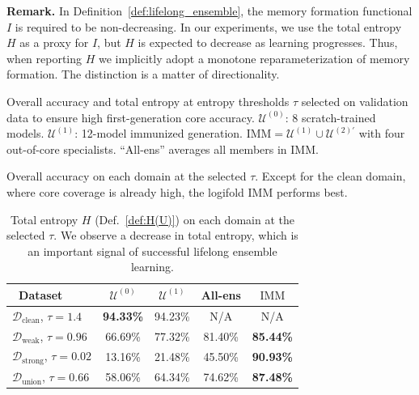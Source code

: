 \documentclass{article}
\theoremstyle{plain}
\theoremstyle{definition}
\theoremstyle{remark}
\newcommand{\cU}{\mathcal{U}}
\newcommand{\IMM}{\mathrm{IMM}}
\newcommand{\cD}{\mathcal{D}}
\begin{document}
\textbf{Remark.}
In Definition~\ref{def:lifelong_ensemble}, the memory formation functional $I$ is required to be non-decreasing.
In our experiments, we use the total entropy $H$ as a proxy for $I$, but $H$ is expected to decrease as learning progresses.
Thus, when reporting $H$ we implicitly adopt a monotone reparameterization of memory formation. The distinction is a matter of directionality.

\begin{table}[t]
	\centering
	\vspace{0.1in}
	\caption{Overall accuracy and total entropy at entropy thresholds $\tau$ selected on validation data to ensure high first-generation core accuracy. $\cU^{(0)}$: 8 scratch-trained models. $\cU^{(1)}$: 12-model immunized generation. $\IMM=\cU^{(1)}\cup\cU^{(2)'}$ with four out-of-core specialists. ``All-ens'' averages all members in $\IMM$.}
	
	\label{tab:eval_summary}
		\vspace{0.1in}

	
	\begin{subtable}{1.0\linewidth}
		\centering
			\vspace{0.1in}
			\caption{Overall accuracy on each domain at the selected $\tau$. Except for the clean domain, where core coverage is already high, the logifold $\IMM$ performs best.}
			
		\label{tab:acc_eval}
			\vspace{0.1in}
		{\footnotesize
		\begin{tabular}{lcccc}
			\toprule
			\  Dataset & $\cU^{(0)}$ & $\cU^{(1)}$  & All-ens& $\IMM$  \\
			\midrule
			$\cD_{\mathrm{clean}}$, \scriptsize{$\tau = 1.4$}  & \textbf{94.33\%} & 94.23\%& N/A& N/A \\
			$\cD_{\mathrm{weak}}$, \scriptsize{$\tau = 0.96$}& 66.69\%& 77.32\%&81.40\%  & \textbf{85.44\%}\\
			$\cD_{\mathrm{strong}}$, \scriptsize{$\tau = 0.02$} & 13.16\%& 21.48\%&45.50\% & \textbf{90.93\%} \\
			$\cD_{\mathrm{union}}$, \scriptsize{$\tau = 0.66$}      & 58.06\%& 64.34\%& 74.62\%&\textbf{87.48\%} \\  
			\bottomrule
		\end{tabular}}
	\end{subtable}
	
	\begin{subtable}{0.98\linewidth}
		\centering
			\vspace{0.1in}
			\caption{Total entropy $H$ (Def.~\ref{def:H(U)}) on each domain at the selected $\tau$. We observe a decrease in total entropy, which is an important signal of successful lifelong ensemble learning.}
		

\end{subtable}
\end{table}
\end{document}
